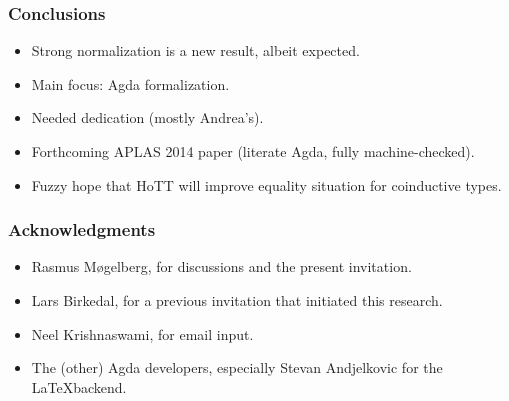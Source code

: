\documentclass[t]{beamer}
\newcommand{\cAnn}{\color{red!80!black}}%
\renewcommand{\emph}[1]{{\cAnn#1}}
\begin{document}
\begin{frame}%
  \frametitle{Conclusions}
  \begin{itemize}
  \item \emph{Strong} normalization is a new result, albeit expected.
  \item Main focus: Agda formalization.
  \item Needed dedication (mostly Andrea's).
  \item Forthcoming APLAS 2014 paper (literate Agda, fully
    machine-checked).
  \item Fuzzy hope that HoTT will improve equality situation for
    coinductive types.
  \end{itemize}
\end{frame}


\begin{frame}%
  \frametitle{Acknowledgments}
  \begin{itemize}
  \item Rasmus M\o{}gelberg, for discussions and the present invitation.
  \item Lars Birkedal, for a previous invitation that initiated this
    research.
  \item Neel Krishnaswami, for email input.
  \item The (other) Agda developers, especially Stevan Andjelkovic for
    the \LaTeX backend.
  \end{itemize}
\end{frame}


% 
\end{document}
